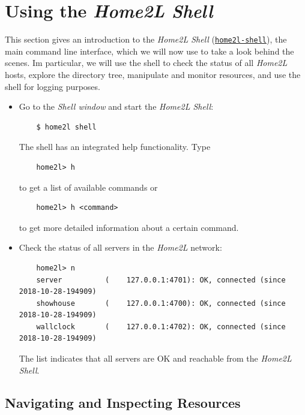 \documentclass[12pt,english,parskip=half]{scrreprt}
\newcommand{\idx}[1]{#1\index{#1}}
\newcommand{\toolref}[1]{\hyperref[tool:#1]{\texttt{\idx{#1}}}}
\begin{document}
\section{Using the \emph{Home2L Shell}}
\label{sec:tutorial-shell}


This section gives an introduction to the \emph{Home2L Shell} (\toolref{home2l-shell}),
the main command line interface, which we will now use to take a look behind the
scenes. Im particular, we will use the shell to check the status of all
\emph{Home2L} hosts, explore the directory tree, manipulate and monitor
resources, and use the shell for logging purposes.

\begin{itemize}[$\blacktriangleright$]
\item
  Go to the \emph{Shell window} and start the \emph{Home2L Shell}:
  \begin{lstlisting}
    $ home2l shell
  \end{lstlisting}
  The shell has an integrated help functionality. Type
  \begin{lstlisting}
    home2l> h
  \end{lstlisting}
  to get a list of available commands or
  \begin{lstlisting}
    home2l> h <command>
  \end{lstlisting}
  to get more detailed information about a certain command.

\item
  Check the status of all servers in the \emph{Home2L} network:
  \begin{lstlisting}
    home2l> n
    server          (    127.0.0.1:4701): OK, connected (since 2018-10-28-194909)
    showhouse       (    127.0.0.1:4700): OK, connected (since 2018-10-28-194909)
    wallclock       (    127.0.0.1:4702): OK, connected (since 2018-10-28-194909)
  \end{lstlisting}
  The list indicates that all servers are OK and reachable from the
  \emph{Home2L Shell}.
\end{itemize}



\subsection{Navigating and Inspecting Resources}
\label{sec:tutorial-shell-inspect}
\end{document}
